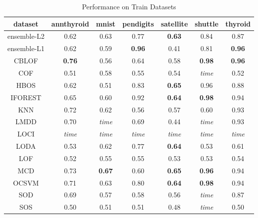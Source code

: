 \begin{table*}[!t]
\renewcommand{\arraystretch}{1.25}
\caption{Performance on Train Datasets}
\label{table:results:train-performance}
\centering
\begin{tabular}{|c|c|c|c|c|c|c|}
\hline
\textbf{dataset} & \textbf{annthyroid} & \textbf{mnist} & \textbf{pendigits} & \textbf{satellite} & \textbf{shuttle} & \textbf{thyroid} \\
\hline
ensemble-L2 & 0.62 & 0.63 & 0.77 & \bfseries 0.63 & 0.84 & 0.87 \\
\hline
ensemble-L1 & 0.62 & 0.59 & \bfseries 0.96 & 0.41 & 0.81 & \bfseries 0.96 \\
\hline
CBLOF & \bfseries 0.76 & 0.56 & 0.64 & 0.58 & \bfseries 0.98 & \bfseries 0.96 \\
\hline
COF & 0.51 & 0.58 & 0.55 & 0.54 & \textit{time} & 0.52 \\
\hline
HBOS & 0.62 & 0.51 & 0.83 & \bfseries 0.65 & 0.96 & 0.88 \\
\hline
IFOREST & 0.65 & 0.60 & 0.92 & \bfseries 0.64 & \bfseries 0.98 & 0.94 \\
\hline
KNN & 0.72 & 0.62 & 0.56 & 0.57 & 0.60 & 0.93 \\
\hline
LMDD & 0.70 & \textit{time} & 0.69 & 0.44 & \textit{time} & 0.93 \\
\hline
LOCI & \textit{time} & \textit{time} & \textit{time} & \textit{time} & \textit{time} & \textit{time} \\
\hline
LODA & 0.53 & 0.62 & 0.77 & \bfseries 0.64 & 0.53 & 0.61 \\
\hline
LOF & 0.52 & 0.55 & 0.55 & 0.53 & 0.53 & 0.54 \\
\hline
MCD & 0.73 & \bfseries 0.67 & 0.60 & \bfseries 0.65 & \bfseries 0.96 & 0.94 \\
\hline
OCSVM & 0.71 & 0.63 & 0.80 & \bfseries 0.64 & \bfseries 0.98 & 0.94 \\
\hline
SOD & 0.69 & 0.57 & 0.58 & 0.56 & \textit{time} & 0.87 \\
\hline
SOS & 0.50 & 0.51 & 0.51 & 0.48 & \textit{time} & 0.50 \\
\hline
\end{tabular}
\end{table*}


